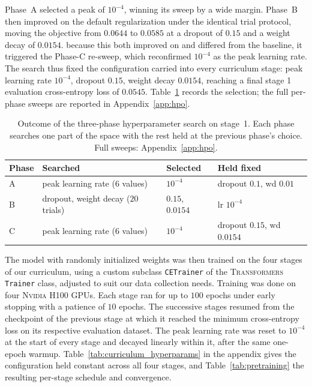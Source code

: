 \documentclass[titlepage,a4paper,11pt]{report}
\begin{document}
    Phase~A selected a peak of $10^{-4}$, winning its sweep by a wide margin. Phase~B then improved on the default regularization under the identical trial protocol, moving the objective from $0.0644$ to $0.0585$ at a dropout of $0.15$ and a weight decay of $0.0154$. because this both improved on and differed from the baseline, it triggered the Phase-C re-sweep, which reconfirmed $10^{-4}$ as the peak learning rate. The search thus fixed the configuration carried into every curriculum stage: peak learning rate $10^{-4}$, dropout $0.15$, weight decay $0.0154$, reaching a final stage 1 evaluation cross-entropy loss of $0.0545$. Table~\ref{tab:hpo_summary} records the selection; the full per-phase sweeps are reported in Appendix~\ref{app:hpo}.
    
    \begin{table}[ht]
        \centering
        \caption{Outcome of the three-phase hyperparameter search on stage~1. Each phase searches one part of the space with the rest held at the previous phase's choice. Full sweeps: Appendix~\ref{app:hpo}.}
        \label{tab:hpo_summary}
        \begin{tabular}{llll}
            \toprule
            Phase & Searched & Selected & Held fixed \\
            \midrule
            A & peak learning rate ($6$ values)   & $10^{-4}$        & dropout $0.1$, wd $0.01$ \\
            B & dropout, weight decay ($20$ trials) & $0.15$, $0.0154$ & lr $10^{-4}$ \\
            C & peak learning rate ($6$ values)   & $10^{-4}$        & dropout $0.15$, wd $0.0154$ \\
            \bottomrule
        \end{tabular}
    \end{table}
    
    The model with randomly initialized weights was then trained on the four stages of our curriculum, using a custom subclass \texttt{CETrainer} of the \textsc{Transformers} \texttt{Trainer} class, adjusted to suit our data collection needs. Training was done on four \textsc{Nvidia H100} GPUs. Each stage ran for up to $100$ epochs under early stopping with a patience of $10$ epochs. The successive stages resumed from the checkpoint of the previous stage at which it reached the minimum cross-entropy loss on its respective evaluation dataset. The peak learning rate was reset to $10^{-4}$ at the start of every stage and decayed linearly within it, after the same one-epoch warmup. Table~\ref{tab:curriculum_hyperparams} in the appendix gives the configuration held constant across all four stages, and Table~\ref{tab:pretraining} the resulting per-stage schedule and convergence.
    
\end{document}
